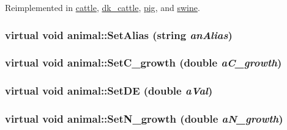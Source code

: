 Reimplemented in \hyperlink{classcattle_a13ca8c9803fc7d414933e0cacb5e398c}{cattle}, \hyperlink{classdk__cattle_a7b51caf022492f303671bc80780bc49c}{dk\_\-cattle}, \hyperlink{classpig_a43fbf15dc40e35fbfd5939c1748ff71b}{pig}, and \hyperlink{classswine_a57668c3c30994f0c3969dcef6d7280db}{swine}.\hypertarget{classanimal_a17002f60dd1721a4a73dd67bf4905ca0}{
\subsubsection[{SetAlias}]{\setlength{\rightskip}{0pt plus 5cm}virtual void animal::SetAlias (string {\em anAlias})}}
\label{classanimal_a17002f60dd1721a4a73dd67bf4905ca0}
\hypertarget{classanimal_a608092b77c96f9b667b5c4e7821a1db0}{
\subsubsection[{SetC\_\-growth}]{\setlength{\rightskip}{0pt plus 5cm}virtual void animal::SetC\_\-growth (double {\em aC\_\-growth})}}
\label{classanimal_a608092b77c96f9b667b5c4e7821a1db0}
\hypertarget{classanimal_ab02fcc3a55c323f5bde1e50515e049ff}{
\subsubsection[{SetDE}]{\setlength{\rightskip}{0pt plus 5cm}virtual void animal::SetDE (double {\em aVal})}}
\label{classanimal_ab02fcc3a55c323f5bde1e50515e049ff}
\hypertarget{classanimal_a80c4d74b88eb18cb48c4abe1a327d8ce}{
\subsubsection[{SetN\_\-growth}]{\setlength{\rightskip}{0pt plus 5cm}virtual void animal::SetN\_\-growth (double {\em aN\_\-growth})}}
